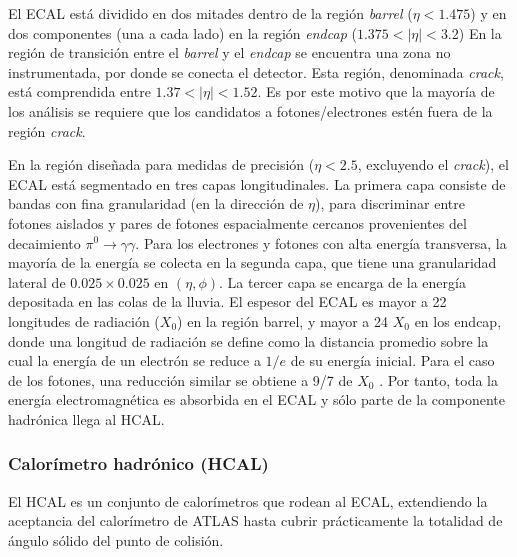 El ECAL está dividido en dos mitades dentro de la
región \textit{barrel} ($\eta < 1.475$) y en dos componentes (una a cada
lado) en la región \textit{endcap} ($1.375 < |\eta| < 3.2$) En la región de transición entre el \textit{barrel} y el \textit{endcap} se encuentra una zona no instrumentada, por donde se conecta el detector. Esta región, denominada \textit{crack}, está comprendida entre $1.37 < |\eta| < 1.52$. Es por este motivo que la mayoría de los análisis se requiere que los candidatos a fotones/electrones estén fuera de la región \textit{crack}.

En la región diseñada para medidas de precisión ($\eta < 2.5$, excluyendo el \textit{crack}),
el ECAL está segmentado en tres capas longitudinales. La primera capa consiste de
bandas con fina granularidad (en la dirección de $\eta$), para discriminar entre fotones
aislados y pares de fotones espacialmente cercanos provenientes del decaimiento
$\pi^0\to\gamma\gamma$. Para los electrones y fotones con alta energía transversa, la mayoría
de la energía se colecta en la segunda capa, que tiene una granularidad lateral de
$0.025 \times 0.025$ en $(\eta, \phi)$. La tercer capa se encarga de la energía depositada en las
colas de la lluvia.
El espesor del ECAL es mayor a 22 longitudes de radiación ($X_0$) en la región
barrel, y mayor a 24 $X_0$ en los endcap, donde una longitud de radiación se define
como la distancia promedio sobre la cual la energía de un electrón se reduce a $1/e$
de su energía inicial. Para el caso de los fotones, una reducción similar se obtiene a
9/7 de $X_0$ . Por tanto, toda la energía electromagnética es absorbida en el ECAL y
sólo parte de la componente hadrónica llega al HCAL.

\subsubsection{Calorímetro hadrónico (HCAL)}

El HCAL es un conjunto de calorímetros que rodean al ECAL, extendiendo la aceptancia del calorímetro de ATLAS hasta cubrir prácticamente la totalidad de ángulo sólido del punto de colisión.

